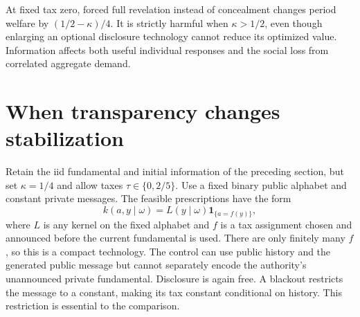 \documentclass[11pt,a4paper]{article}
\newcommand{\ind}{\mathbf 1}
\begin{document}
At fixed tax zero, forced full revelation instead of concealment changes
period welfare by $(1/2-\kappa)/4$. It is strictly harmful when
$\kappa>1/2$, even though enlarging an optional disclosure technology cannot
reduce its optimized value. Information affects both useful individual
responses and the social loss from correlated aggregate demand.

\section{When transparency changes stabilization}
Retain the iid fundamental and initial information of the preceding section,
but set $\kappa=1/4$ and allow taxes $\tau\in\{0,2/5\}$.
Use a fixed binary public alphabet and constant private messages. The feasible
prescriptions have the form
\[
 k(a,y\mid\omega)=L(y\mid\omega)\ind_{\{a=f(y)\}},
\]
where $L$ is any kernel on the fixed alphabet and $f$ is a tax assignment
chosen and announced before the current fundamental is used. There are only
finitely many $f$, so this is a compact technology. The control can use public
history and the generated public message but cannot separately encode the
authority's unannounced private fundamental. Disclosure is again free. A
blackout restricts the message to a constant, making its tax constant
conditional on history. This restriction is essential to the comparison.
\end{document}
